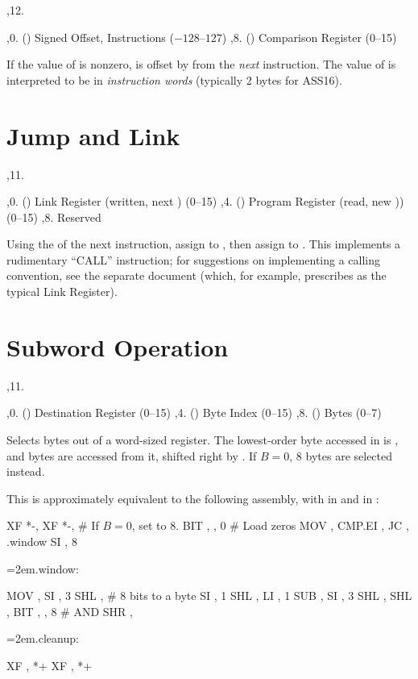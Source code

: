 \noindent\ins{},12. 

\li \ins{},0. () Signed Offset, Instructions ($-128$--$127$)
\li \ins{},8. () Comparison Register (0--15)

If the value of  is nonzero,  is offset by  from the
{\it next} instruction. The value of  is interpreted to be in {\it
instruction words} (typically 2 bytes for ASS16).

\section{Jump and Link}

\noindent\ins{},11. 

\li \ins{},0. () Link Register (written, next ) (0--15)
\li \ins{},4. () Program Register (read, new )) (0--15)
\li \ins{},8. Reserved

Using the  of the next instruction, assign  to , then
assign  to . This implements a rudimentary ``CALL'' instruction;
for suggestions on implementing a calling convention, see the separate
document (which, for example, prescribes  as the typical Link
Register).

\section{Subword Operation}

\noindent\ins{},11. 

\li \ins{},0. () Destination Register (0--15)
\li \ins{},4. () Byte Index (0--15)
\li \ins{},8. () Bytes (0--7)

Selects bytes out of a word-sized register. The lowest-order byte accessed in
 is , and  bytes are accessed from it, shifted right by
. If $B = 0$, 8 bytes are selected instead.

This is approximately equivalent to the following assembly, with  in
 and  in :

\startblock
	XF *-, 
	XF *-, 
	\# If $B = 0$, set  to 8.
	BIT , , 0  \# Load zeros
	MOV , 
	CMP.EI , 
	JC , .window
	SI , 8
{\leftskip=2em.window:\par}
	MOV , 
	SI , 3
	SHL ,   \# 8 bits to a byte
	SI , 1
	SHL , 
	LI , 1
	SUB , 
	SI , 3
	SHL , 
	SHL , 
	BIT , , 8  \# AND
	SHR , 
{\leftskip=2em.cleanup:\par}
	XF , *+
	XF , *+
\endblock

